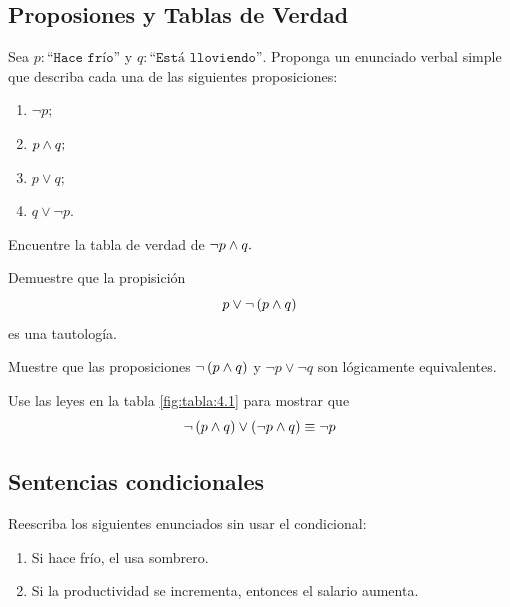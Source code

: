\subsection{Proposiones y Tablas de Verdad}


 \begin{problema}
  Sea $p:\texttt{``Hace fr\'io''}$ y $q:\texttt{``Est\'a lloviendo''.}$ Proponga un enunciado verbal simple que describa cada una de las siguientes proposiciones:
  \begin{enumerate}
   \item $\neg p;$
   \item $p \wedge q;$
   \item $p \vee q;$
   \item $q \vee \neg p.$
  \end{enumerate}

 \end{problema}




 \begin{problema}
  Encuentre la tabla de verdad de $\neg p \wedge q.$
 \end{problema}




 \begin{problema}
  Demuestre que la propisici\'on 
  $$
  p \vee \neg \left( p\wedge q \right)
  $$ es una tautolog\'ia.
 \end{problema}




 \begin{problema}
  Muestre que las proposiciones $\neg\left( p \wedge q \right)$ y $\neg p \vee \neg q$ son l\'ogicamente equivalentes.
 \end{problema}




 \begin{problema}
  Use las leyes en la tabla \ref{fig:tabla:4.1} para mostrar que 
  $$
  \neg \left( p \wedge q \right) \vee \left( \neg p \wedge  q \right) \equiv \neg p
  $$
 \end{problema}



\subsection{Sentencias condicionales}


 \begin{problema}
  \label{lip:sol:4.6}
  Reescriba los siguientes enunciados sin usar el condicional:
  \begin{enumerate}
   \item Si hace fr\'io, el usa sombrero. 
   \item Si la productividad se incrementa, entonces el salario aumenta.
  \end{enumerate}

 \end{problema}





